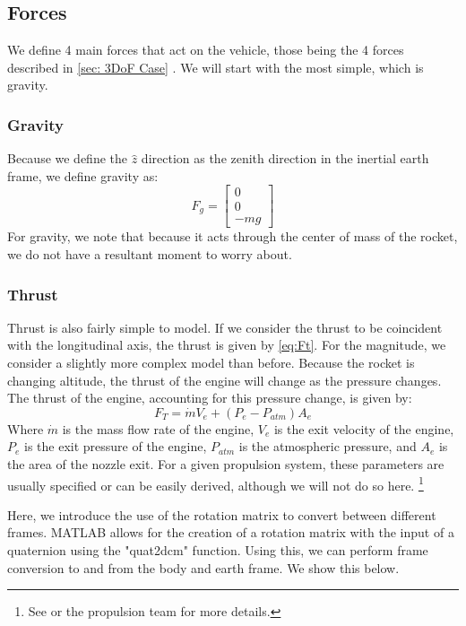 \documentclass[10pt, openany, titlepage]{book}
\theoremstyle{definition}
\let\oldautoref\autoref
\renewcommand{\autoref}[1]{%
  \begingroup
  \hypersetup{linkcolor=black}%
  \oldautoref{#1}%
  \endgroup
}
\begin{document}
\subsection{Forces}\label{6DoF Forces}
We define 4 main forces that act on the vehicle, those being the 4 forces described in \autoref{sec: 3DoF Case}. We will start with the most simple, which is gravity.
\subsubsection{Gravity}
Because we define the $\hat{z}$ direction as the zenith direction in the inertial earth frame, we define gravity as:
\begin{equation}
   F_g= \begin{bmatrix}
    0\\0\\-mg
\end{bmatrix}
\end{equation}
For gravity, we note that because it acts through the center of mass of the rocket, we do not have a resultant moment to worry about.
\subsubsection{Thrust}
Thrust is also fairly simple to model. If we consider the thrust to be coincident with the longitudinal axis, the thrust is given by \eqref{eq:Ft}. For the magnitude, we consider a slightly more complex model than before. Because the rocket is changing altitude, the thrust of the engine will change as the pressure changes. The thrust of the engine, accounting for this pressure change, is given by:
\begin{equation}
    F_T=\dot{m}V_e+\left(P_{e}-P_{atm}\right)A_e
\end{equation}
Where $\dot{m}$ is the mass flow rate of the engine, $V_e$ is the exit velocity of the engine, $P_e$ is the exit pressure of the engine, $P_{atm}$ is the atmospheric pressure, and $A_e$ is the area of the nozzle exit. For a given propulsion system, these parameters are usually specified or can be easily derived, although we will not do so here. \footnote{See \cite{dasilva_chemical_2023} or the propulsion team for more details.}

Here, we introduce the use of the rotation matrix to convert between different frames. MATLAB allows for the creation of a rotation matrix with the input of a \gls{quaternion} using the "quat2dcm" function. Using this, we can perform frame conversion to and from the body and earth frame. We show this below.
\end{document}

